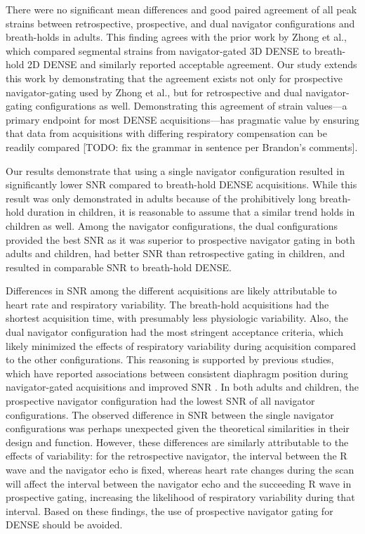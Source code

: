 	There were no significant mean differences and good paired agreement of all peak strains between retrospective, prospective, and dual navigator configurations and breath-holds in adults. This finding agrees with the prior work by Zhong et al., which compared segmental strains from navigator-gated 3D DENSE to breath-hold 2D DENSE \cite{Zhong2010a} and similarly reported acceptable agreement. Our study extends this work by demonstrating that the agreement exists not only for prospective navigator-gating used by Zhong et al., but for retrospective and dual navigator-gating configurations as well. Demonstrating this agreement of strain values—a primary endpoint for most DENSE acquisitions—has pragmatic value by ensuring that data from acquisitions with differing respiratory compensation can be readily compared [TODO: fix the grammar in sentence per Brandon's comments].
	
	Our results demonstrate that using a single navigator configuration resulted in significantly lower SNR compared to breath-hold DENSE acquisitions. While this result was only demonstrated in adults because of the prohibitively long breath-hold duration in children, it is reasonable to assume that a similar trend holds in children as well. Among the navigator configurations, the dual configurations provided the best SNR as it was superior to prospective navigator gating in both adults and children, had better SNR than retrospective gating in children, and resulted in comparable SNR to breath-hold DENSE.
	
	Differences in SNR among the different acquisitions are likely attributable to heart rate and respiratory variability. The breath-hold acquisitions had the shortest acquisition time, with presumably less physiologic variability. Also, the dual navigator configuration had the most stringent acceptance criteria, which likely minimized the effects of respiratory variability during acquisition compared to the other configurations. This reasoning is supported by previous studies, which have reported associations between consistent diaphragm position during navigator-gated acquisitions and improved SNR \cite{Feuerlein2009,Jhooti2011}. In both adults and children, the prospective navigator configuration had the lowest SNR of all navigator configurations. The observed difference in SNR between the single navigator configurations was perhaps unexpected given the theoretical similarities in their design and function. However, these differences are similarly attributable to the effects of variability: for the retrospective navigator, the interval between the R wave and the navigator echo is fixed, whereas heart rate changes during the scan will affect the interval between the navigator echo and the succeeding R wave in prospective gating, increasing the likelihood of respiratory variability during that interval. Based on these findings, the use of prospective navigator gating for DENSE should be avoided.
	
